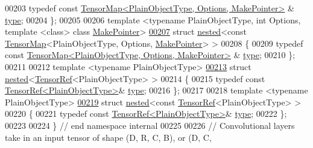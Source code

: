 \begin{DoxyCode}
00203   \textcolor{keyword}{typedef} \textcolor{keyword}{const} \hyperlink{class_eigen_1_1_tensor_map}{TensorMap<PlainObjectType, Options, MakePointer>}
      & \hyperlink{class_eigen_1_1_tensor_map}{type};
00204 \};
00205 
00206 \textcolor{keyword}{template} <\textcolor{keyword}{typename} PlainObjectType, \textcolor{keywordtype}{int} Options, \textcolor{keyword}{template} <\textcolor{keyword}{class}> \textcolor{keyword}{class }
      \hyperlink{struct_eigen_1_1_make_pointer}{MakePointer}>
\hyperlink{struct_eigen_1_1internal_1_1nested_3_01const_01_tensor_map_3_01_plain_object_type_00_01_options_00_01_make_pointer_01_4_01_4}{00207} \textcolor{keyword}{struct }\hyperlink{struct_eigen_1_1internal_1_1nested}{nested}<const \hyperlink{class_eigen_1_1_tensor_map}{TensorMap}<PlainObjectType, Options, 
      \hyperlink{struct_eigen_1_1_make_pointer}{MakePointer}> >
00208 \{
00209   \textcolor{keyword}{typedef} \textcolor{keyword}{const} \hyperlink{class_eigen_1_1_tensor_map}{TensorMap<PlainObjectType, Options, MakePointer>}
      & \hyperlink{class_eigen_1_1_tensor_map}{type};
00210 \};
00211 
00212 \textcolor{keyword}{template} <\textcolor{keyword}{typename} PlainObjectType>
\hyperlink{struct_eigen_1_1internal_1_1nested_3_01_tensor_ref_3_01_plain_object_type_01_4_01_4}{00213} \textcolor{keyword}{struct }\hyperlink{struct_eigen_1_1internal_1_1nested}{nested}<\hyperlink{class_eigen_1_1_tensor_ref}{TensorRef}<PlainObjectType> >
00214 \{
00215   \textcolor{keyword}{typedef} \textcolor{keyword}{const} \hyperlink{class_eigen_1_1_tensor_ref}{TensorRef<PlainObjectType>}& \hyperlink{class_eigen_1_1_tensor_ref}{type};
00216 \};
00217 
00218 \textcolor{keyword}{template} <\textcolor{keyword}{typename} PlainObjectType>
\hyperlink{struct_eigen_1_1internal_1_1nested_3_01const_01_tensor_ref_3_01_plain_object_type_01_4_01_4}{00219} \textcolor{keyword}{struct }\hyperlink{struct_eigen_1_1internal_1_1nested}{nested}<const \hyperlink{class_eigen_1_1_tensor_ref}{TensorRef}<PlainObjectType> >
00220 \{
00221   \textcolor{keyword}{typedef} \textcolor{keyword}{const} \hyperlink{class_eigen_1_1_tensor_ref}{TensorRef<PlainObjectType>}& \hyperlink{class_eigen_1_1_tensor_ref}{type};
00222 \};
00223 
00224 \}  \textcolor{comment}{// end namespace internal}
00225 
00226 \textcolor{comment}{// Convolutional layers take in an input tensor of shape (D, R, C, B), or (D, C,}

\end{DoxyCode}
